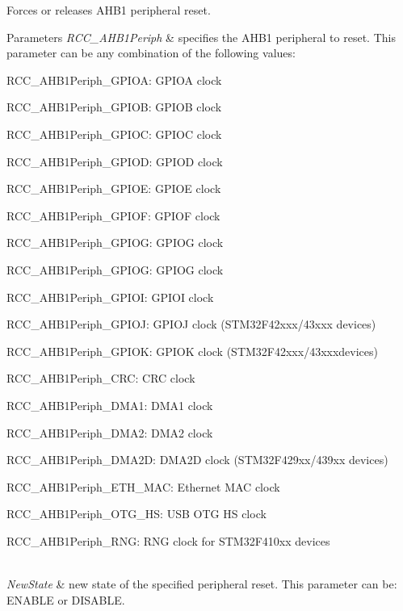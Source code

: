 Forces or releases A\+H\+B1 peripheral reset. 


\begin{DoxyParams}{Parameters}
{\em R\+C\+C\+\_\+\+A\+H\+B1\+Periph} & specifies the A\+H\+B1 peripheral to reset. This parameter can be any combination of the following values\+: \begin{DoxyItemize}
\item R\+C\+C\+\_\+\+A\+H\+B1\+Periph\+\_\+\+G\+P\+I\+OA\+: G\+P\+I\+OA clock \item R\+C\+C\+\_\+\+A\+H\+B1\+Periph\+\_\+\+G\+P\+I\+OB\+: G\+P\+I\+OB clock \item R\+C\+C\+\_\+\+A\+H\+B1\+Periph\+\_\+\+G\+P\+I\+OC\+: G\+P\+I\+OC clock \item R\+C\+C\+\_\+\+A\+H\+B1\+Periph\+\_\+\+G\+P\+I\+OD\+: G\+P\+I\+OD clock \item R\+C\+C\+\_\+\+A\+H\+B1\+Periph\+\_\+\+G\+P\+I\+OE\+: G\+P\+I\+OE clock \item R\+C\+C\+\_\+\+A\+H\+B1\+Periph\+\_\+\+G\+P\+I\+OF\+: G\+P\+I\+OF clock \item R\+C\+C\+\_\+\+A\+H\+B1\+Periph\+\_\+\+G\+P\+I\+OG\+: G\+P\+I\+OG clock \item R\+C\+C\+\_\+\+A\+H\+B1\+Periph\+\_\+\+G\+P\+I\+OG\+: G\+P\+I\+OG clock \item R\+C\+C\+\_\+\+A\+H\+B1\+Periph\+\_\+\+G\+P\+I\+OI\+: G\+P\+I\+OI clock \item R\+C\+C\+\_\+\+A\+H\+B1\+Periph\+\_\+\+G\+P\+I\+OJ\+: G\+P\+I\+OJ clock (S\+T\+M32\+F42xxx/43xxx devices) \item R\+C\+C\+\_\+\+A\+H\+B1\+Periph\+\_\+\+G\+P\+I\+OK\+: G\+P\+I\+OK clock (S\+T\+M32\+F42xxx/43xxxdevices) ~\newline
 \item R\+C\+C\+\_\+\+A\+H\+B1\+Periph\+\_\+\+C\+RC\+: C\+RC clock \item R\+C\+C\+\_\+\+A\+H\+B1\+Periph\+\_\+\+D\+M\+A1\+: D\+M\+A1 clock \item R\+C\+C\+\_\+\+A\+H\+B1\+Periph\+\_\+\+D\+M\+A2\+: D\+M\+A2 clock \item R\+C\+C\+\_\+\+A\+H\+B1\+Periph\+\_\+\+D\+M\+A2D\+: D\+M\+A2D clock (S\+T\+M32\+F429xx/439xx devices) ~\newline
 \item R\+C\+C\+\_\+\+A\+H\+B1\+Periph\+\_\+\+E\+T\+H\+\_\+\+M\+AC\+: Ethernet M\+AC clock \item R\+C\+C\+\_\+\+A\+H\+B1\+Periph\+\_\+\+O\+T\+G\+\_\+\+HS\+: U\+SB O\+TG HS clock \item R\+C\+C\+\_\+\+A\+H\+B1\+Periph\+\_\+\+R\+NG\+: R\+NG clock for S\+T\+M32\+F410xx devices\end{DoxyItemize}
\\
\hline
{\em New\+State} & new state of the specified peripheral reset. This parameter can be\+: E\+N\+A\+B\+LE or D\+I\+S\+A\+B\+LE. \\
\hline
\end{DoxyParams}

